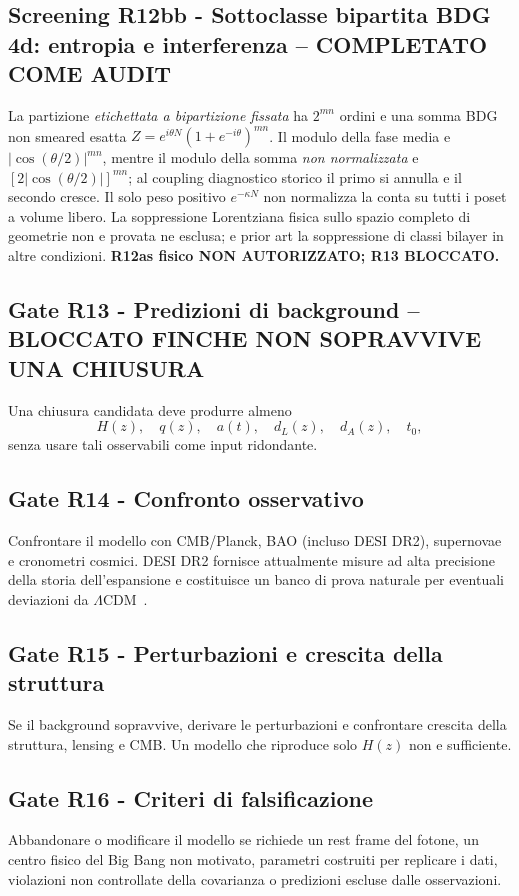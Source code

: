 \documentclass[11pt,a4paper]{article}
\newcommand{\LCDM}{\ensuremath{\Lambda\mathrm{CDM}}}
\begin{document}
\subsection*{Screening R12bb - Sottoclasse bipartita BDG 4d: entropia e interferenza -- COMPLETATO COME AUDIT}
La partizione \emph{etichettata a bipartizione fissata} ha $2^{mn}$ ordini e una somma BDG non smeared esatta $Z=e^{i\theta N}(1+e^{-i\theta})^{mn}$. Il modulo della fase media e $|\cos(\theta/2)|^{mn}$, mentre il modulo della somma \emph{non normalizzata} e $[2|\cos(\theta/2)|]^{mn}$; al coupling diagnostico storico il primo si annulla e il secondo cresce. Il solo peso positivo $e^{-\kappa N}$ non normalizza la conta su tutti i poset a volume libero. La soppressione Lorentziana fisica sullo spazio completo di geometrie non e provata ne esclusa; e prior art la soppressione di classi bilayer in altre condizioni. \textbf{R12as fisico NON AUTORIZZATO; R13 BLOCCATO.}\par\medskip

\subsection*{Gate R13 - Predizioni di background -- BLOCCATO FINCHE NON SOPRAVVIVE UNA CHIUSURA}
Una chiusura candidata deve produrre almeno
\begin{equation}
 H(z),\quad q(z),\quad a(t),\quad d_L(z),\quad d_A(z),\quad t_0,
\end{equation}
senza usare tali osservabili come input ridondante.

\subsection*{Gate R14 - Confronto osservativo}
Confrontare il modello con CMB/Planck, BAO (incluso DESI DR2), supernovae e cronometri cosmici. DESI DR2 fornisce attualmente misure ad alta precisione della storia dell'espansione e costituisce un banco di prova naturale per eventuali deviazioni da \LCDM\ \cite{DESI2025,DESI2026}.

\subsection*{Gate R15 - Perturbazioni e crescita della struttura}
Se il background sopravvive, derivare le perturbazioni e confrontare crescita della struttura, lensing e CMB. Un modello che riproduce solo $H(z)$ non e sufficiente.

\subsection*{Gate R16 - Criteri di falsificazione}
Abbandonare o modificare il modello se richiede un rest frame del fotone, un centro fisico del Big Bang non motivato, parametri costruiti per replicare i dati, violazioni non controllate della covarianza o predizioni escluse dalle osservazioni.
\end{document}
